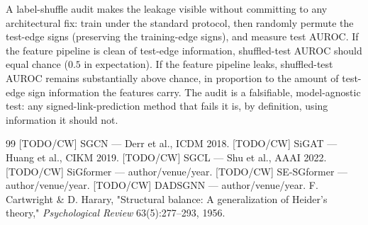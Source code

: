 \documentclass[11pt]{article}
\begin{document}
A label-shuffle audit makes the leakage visible without committing
to any architectural fix: train under the standard protocol, then
randomly permute the test-edge signs (preserving the training-edge
signs), and measure test AUROC. If the feature pipeline is clean of
test-edge information, shuffled-test AUROC should equal chance
($0.5$ in expectation). If the feature pipeline leaks, shuffled-test
AUROC remains substantially above chance, in proportion to the
amount of test-edge sign information the features carry. The audit
is a falsifiable, model-agnostic test: any signed-link-prediction
method that fails it is, by definition, using information it
should not.

\begin{thebibliography}{99}
      [TODO/CW] SGCN — Derr et al., ICDM 2018.
     [TODO/CW] SiGAT — Huang et al., CIKM 2019.
      [TODO/CW] SGCL — Shu et al., AAAI 2022.
   [TODO/CW] SiGformer — author/venue/year.
   [TODO/CW] SE-SGformer — author/venue/year.
   [TODO/CW] DADSGNN — author/venue/year.
   F. Cartwright \& D. Harary, "Structural
    balance: A generalization of Heider's theory,"
    \emph{Psychological Review} 63(5):277--293, 1956.
\end{thebibliography}
\end{document}
